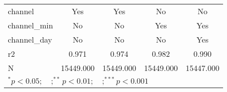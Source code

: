 \begin{tabular}{l*{4}{c}}
channel             &         Yes   &         Yes   &          No   &          No   \\
channel\_min         &          No   &          No   &         Yes   &         Yes   \\
channel\_day         &          No   &          No   &          No   &         Yes   \\
r2                  &       0.971   &       0.974   &       0.982   &       0.990   \\
N                   &   15449.000   &   15449.000   &   15449.000   &   15447.000   \\
\bottomrule
\multicolumn{5}{l}{\footnotesize $^{*}p<0.05; \quad ; ^{**} p<0.01; \quad ; ^{***}p<0.001$}\\
\end{tabular}
